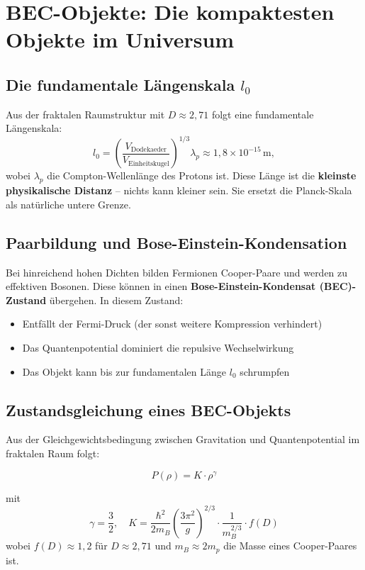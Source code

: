 \documentclass[12pt,a4paper]{article}
\begin{document}
\section{BEC-Objekte: Die kompaktesten Objekte im Universum}

\subsection{Die fundamentale Längenskala $l_0$}

Aus der fraktalen Raumstruktur mit $D \approx 2{,}71$ folgt eine fundamentale Längenskala:
\[
l_0 = \left( \frac{V_{\text{Dodekaeder}}}{V_{\text{Einheitskugel}}} \right)^{1/3} \lambda_p \approx 1{,}8 \times 10^{-15}\,\text{m},
\]
wobei $\lambda_p$ die Compton-Wellenlänge des Protons ist. Diese Länge ist die \textbf{kleinste physikalische Distanz} – nichts kann kleiner sein. Sie ersetzt die Planck-Skala als natürliche untere Grenze.

\subsection{Paarbildung und Bose-Einstein-Kondensation}

Bei hinreichend hohen Dichten bilden Fermionen Cooper-Paare und werden zu effektiven Bosonen. Diese können in einen \textbf{Bose-Einstein-Kondensat (BEC)-Zustand} übergehen. In diesem Zustand:
\begin{itemize}
\item Entfällt der Fermi-Druck (der sonst weitere Kompression verhindert)
\item Das Quantenpotential dominiert die repulsive Wechselwirkung
\item Das Objekt kann bis zur fundamentalen Länge $l_0$ schrumpfen
\end{itemize}

\subsection{Zustandsgleichung eines BEC-Objekts}

Aus der Gleichgewichtsbedingung zwischen Gravitation und Quantenpotential im fraktalen Raum folgt:

\[
\boxed{P(\rho) = K \cdot \rho^{\gamma}}
\]

mit
\[
\gamma = \frac{3}{2}, \quad K = \frac{\hbar^2}{2m_B} \left( \frac{3\pi^2}{g} \right)^{2/3} \cdot \frac{1}{m_B^{2/3}} \cdot f(D)
\]
wobei $f(D) \approx 1,2$ für $D \approx 2{,}71$ und $m_B \approx 2m_p$ die Masse eines Cooper-Paares ist.
\end{document}
